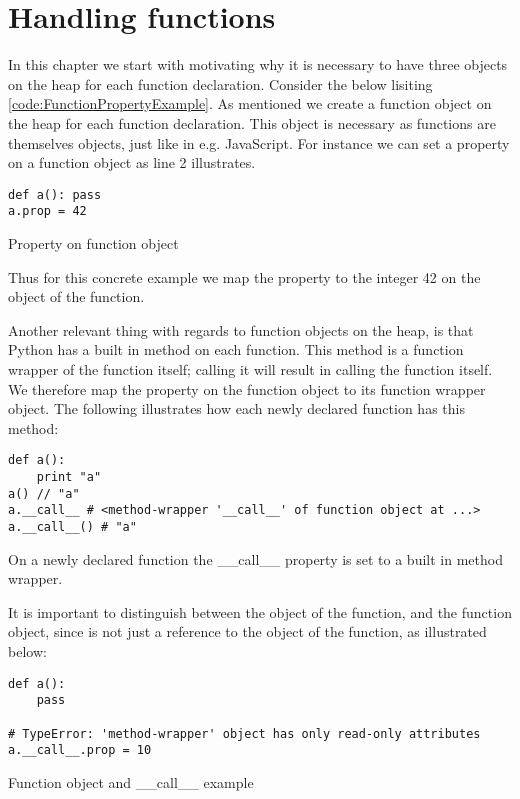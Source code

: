 \chapter{Handling functions}
\label{Functions}
In this chapter we start with motivating why it is necessary to have three objects on the heap for each function declaration. Consider the below lisiting \ref{code:FunctionPropertyExample}. As mentioned we create a function object on the heap for each function declaration. This object is necessary as functions are themselves objects, just like in e.g. JavaScript. For instance we can set a property on a function object as line 2 illustrates.

\begin{listing}[H]
	\begin{verbatim}
def a(): pass
a.prop = 42
	\end{verbatim}
\caption{Property on function object}\label{code:FunctionPropertyExample}
\end{listing}

Thus for this concrete example we map the property  to the integer 42 on the object of the function.

Another relevant thing with regards to function objects on the heap, is that Python has a built in method  on each function. This method is a function wrapper of the function itself; calling it will result in calling the function itself. We therefore map the property  on the function object to its function wrapper object. The following illustrates how each newly declared function has this method:

\begin{listing}[H]
	\begin{verbatim}
def a():
	print "a"
a() // "a"
a.__call__ # <method-wrapper '__call__' of function object at ...> 
a.__call__() # "a"
	\end{verbatim}
\caption{On a newly declared function the \_\_call\_\_ property is set to a built in method wrapper.}\label{code:printFunctionExample}
\end{listing}

It is important to distinguish between the object of the function, and the function object, since  is not just a reference to the object of the function, as illustrated below:

\begin{listing}[H]
	\begin{verbatim}
def a(): 
	pass

# TypeError: 'method-wrapper' object has only read-only attributes
a.__call__.prop = 10
	\end{verbatim}
\caption{Function object and \_\_call\_\_ example}\label{code:callPropertyExample}
\end{listing}

